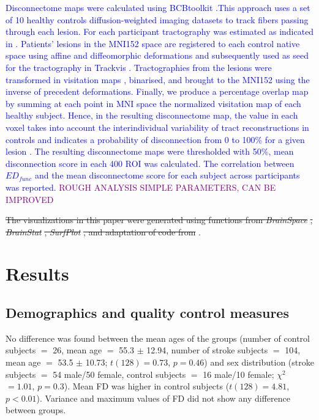 \documentclass[fleqn,10pt]{wlscirep}
\begin{document}
\textcolor{blue}{Disconnectome maps were calculated using BCBtoolkit \citep{foulon2018advanced}.This approach uses a set of 10 healthy controls \citep{rojkova2016atlasing} diffusion-weighted imaging datasets to track fibers passing through each lesion. For each participant tractography was estimated as indicated in \citep{thiebaut2011lateralized}. Patients' lesions in the MNI152 space are registered to each control native space using affine and diffeomorphic deformations \citep{klein2009evaluation, avants2011reproducible} and subsequently used as seed for the tractography in Trackvis \citep{wang2007diffusion}. Tractographies from the lesions were transformed in visitation maps \citep{thiebaut2011lateralized}, binarised, and brought to the MNI152 using the inverse of precedent deformations. Finally, we produce a percentage overlap map by summing at each point in MNI space the normalized visitation map of each healthy subject. Hence, in the resulting disconnectome map, the value in each voxel takes into account the interindividual variability of tract reconstructions in controls and indicates a probability of disconnection from 0 to 100\% for a given lesion \citep{thiebaut2015phineas}. The resulting disconnectome maps were thresholded with 50\%, mean disconnection score in each 400 ROI was calculated. The correlation between $\textit{ED}_{{func}}$ and the mean disconnectome score for each subject across participants was reported.} \textcolor{purple}{ROUGH ANALYSIS SIMPLE PARAMETERS, CAN BE IMPROVED }

\color{red}
\st{The visualizations in this paper were generated using functions from \emph{BrainSpace} }\citep{vos2020brainspace}\st{, \emph{BrainStat}}  \citep{worsley2009matlab}\st{, \emph{SurfPlot} }\citep{gale2021surfplot}\st{, and adaptation of code from} \citet{bayrakgithub}. \color{black}



\section*{Results}

\subsection*{Demographics and quality control measures}
No difference was found between the mean ages of the groups (number of control subjects $=$ 26, mean age $=$ 55.3 $\pm$ 12.94, number of stroke subjects $=$ 104, mean age $=$ 53.5 $\pm$ 10.73; $t(128) = 0.73$, $p = 0.46$) and sex distribution (stroke subjects $=$ 54 male/50 female, control subjects $=$ 16 male/10 female; $\chi^2$ $ = 1.01$, $p = 0.3$). Mean FD was higher in control subjects ($t(128) = 4.81$, $p < 0.01$). Variance and maximum values of FD did not show any difference between groups.
\end{document}
